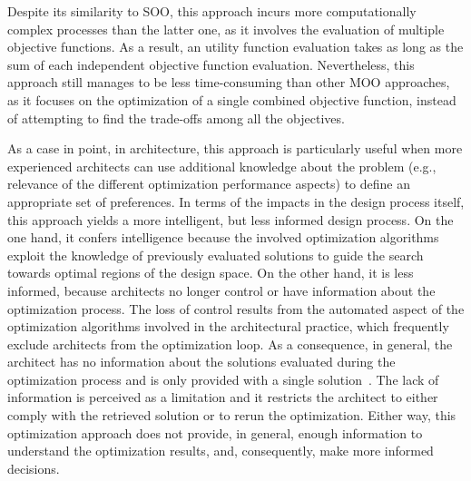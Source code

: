 	Despite its similarity to \ac{SOO}, this approach incurs more computationally complex processes than the latter one, as it involves the evaluation of multiple objective functions. As a result, an utility function evaluation takes as long as the sum of each independent objective function evaluation. Nevertheless, this approach still manages to be less time-consuming than other \ac{MOO} approaches, as it focuses on the optimization of a single combined objective function, instead of attempting to find the trade-offs among all the objectives. 
	
	As a case in point, in architecture, this approach is particularly useful when more experienced architects can use additional knowledge about the problem (e.g., relevance of the different optimization performance aspects) to define an appropriate set of preferences. In terms of the impacts in the design process itself, this approach yields a more intelligent, but less informed design process. On the one hand, it confers intelligence because the involved optimization algorithms exploit the knowledge of previously evaluated solutions to guide the search towards optimal regions of the design space. On the other hand, it is less informed, because architects no longer control or have information about the optimization process. The loss of control results from the automated aspect of the optimization algorithms involved in the architectural practice, which frequently exclude architects from the optimization loop. As a consequence, in general, the architect has no information about the solutions evaluated during the optimization process and is only provided with a single solution~\cite{Custodio2010}. The lack of information is perceived as a limitation \cite{Cichocka2017SURVEY} and it restricts the architect to either comply with the retrieved solution or to rerun the optimization. Either way, this optimization approach does not provide, in general, enough information to understand the optimization results, and, consequently, make more informed decisions. 
	
